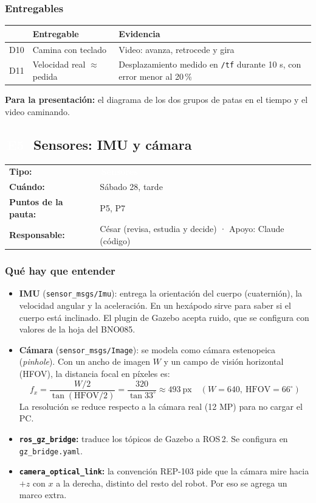 \documentclass[11pt,a4paper]{article}
\makeatletter
\newcommand{\pill}[2]{{\setlength{\fboxsep}{1.6pt}\colorbox{#1}{\textcolor{white}{\footnotesize\bfseries\,#2\,}}}}
\newcommand{\Eci}{\pill{cSens}{E5}}
\newcommand{\ficha}[4]{%
  \begin{tabularx}{\linewidth}{@{}l Y@{}}
  \textbf{Tipo:} & \pill{#1}{#2}\\
  \textbf{Cuándo:} & #3\\
  \textbf{Puntos de la pauta:} & #4\\
  \textbf{Responsable:} & César (revisa, estudia y decide) · Apoyo: Claude (código)\\
  \end{tabularx}\par}
\makeatother
\begin{document}
\subsubsection{Entregables}
\begin{tabularx}{\linewidth}{@{}l Y Y@{}}
\toprule \textbf{} & \textbf{Entregable} & \textbf{Evidencia}\\ \midrule
D10 & Camina con teclado & Video: avanza, retrocede y gira\\
D11 & Velocidad real $\approx$ pedida & Desplazamiento medido en \texttt{/tf} durante 10 s, con error menor al 20\,\%\\
\bottomrule
\end{tabularx}

\textbf{Para la presentación:} el diagrama de los dos grupos de patas en el tiempo y el video caminando.

\subsection{\texorpdfstring{\Eci\ }{E5 }Sensores: IMU y cámara}
\ficha{cSens}{Sensores}{Sábado 28, tarde}{P5, P7}

\subsubsection{Qué hay que entender}
\begin{itemize}
  \item \textbf{IMU} (\texttt{sensor\_msgs/Imu}): entrega la orientación del cuerpo (cuaternión), la velocidad angular y la aceleración. En un hexápodo sirve para saber si el cuerpo está inclinado. El plugin de Gazebo acepta ruido, que se configura con valores de la hoja del BNO085.
  \item \textbf{Cámara} (\texttt{sensor\_msgs/Image}): se modela como cámara estenopeica (\emph{pinhole}). Con un ancho de imagen $W$ y un campo de visión horizontal (HFOV), la distancia focal en píxeles es:
  \begin{equation}
  f_x = \frac{W/2}{\tan(\text{HFOV}/2)} = \frac{320}{\tan 33^\circ} \approx 493\ \text{px}\quad (W = 640,\ \text{HFOV} = 66^\circ)
  \end{equation}
  La resolución se reduce respecto a la cámara real (12 MP) para no cargar el PC.
  \item \textbf{\texttt{ros\_gz\_bridge}:} traduce los tópicos de Gazebo a ROS\,2. Se configura en \texttt{gz\_bridge.yaml}.
  \item \textbf{\texttt{camera\_optical\_link}:} la convención REP-103 pide que la cámara mire hacia $+z$ con $x$ a la derecha, distinto del resto del robot. Por eso se agrega un marco extra.
\end{itemize}
\end{document}
